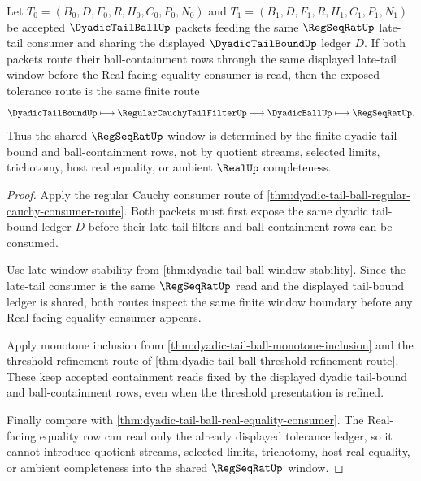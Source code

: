 \begin{theorem}
\label{thm:dyadic-tail-ball-regseq-window-consistency}
Let $T_0=(B_0,D,F_0,R,H_0,C_0,P_0,N_0)$ and $T_1=(B_1,D,F_1,R,H_1,C_1,P_1,N_1)$ be accepted $\DyadicTailBallUp$ packets feeding the same $\RegSeqRatUp$ late-tail consumer and sharing the displayed $\DyadicTailBoundUp$ ledger $D$. If both packets route their ball-containment rows through the same displayed late-tail window before the Real-facing equality consumer is read, then the exposed tolerance route is the same finite route
$$
\DyadicTailBoundUp \longmapsto \RegularCauchyTailFilterUp \longmapsto \DyadicBallUp \longmapsto \RegSeqRatUp .
$$
Thus the shared $\RegSeqRatUp$ window is determined by the finite dyadic tail-bound and ball-containment rows, not by quotient streams, selected limits, trichotomy, host real equality, or ambient $\RealUp$ completeness.
\end{theorem}
\begin{proof}
Apply the regular Cauchy consumer route of \autoref{thm:dyadic-tail-ball-regular-cauchy-consumer-route}. Both packets must first expose the same dyadic tail-bound ledger $D$ before their late-tail filters and ball-containment rows can be consumed.

Use late-window stability from \autoref{thm:dyadic-tail-ball-window-stability}. Since the late-tail consumer is the same $\RegSeqRatUp$ read and the displayed tail-bound ledger is shared, both routes inspect the same finite window boundary before any Real-facing equality consumer appears.

Apply monotone inclusion from \autoref{thm:dyadic-tail-ball-monotone-inclusion} and the threshold-refinement route of \autoref{thm:dyadic-tail-ball-threshold-refinement-route}. These keep accepted containment reads fixed by the displayed dyadic tail-bound and ball-containment rows, even when the threshold presentation is refined.

Finally compare with \autoref{thm:dyadic-tail-ball-real-equality-consumer}. The Real-facing equality row can read only the already displayed tolerance ledger, so it cannot introduce quotient streams, selected limits, trichotomy, host real equality, or ambient completeness into the shared $\RegSeqRatUp$ window.
\end{proof}

